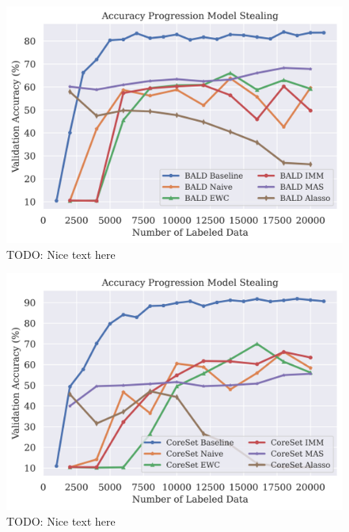 \begin{figure}[h]
    \centering
    \includegraphics[width=0.8\linewidth]{images/results_CALMS/mnist_softmax_bald.png}
    \caption[Accuracy Comparison for Model Stealing on MNIST using the softmax output and the Active Learning strategy BALD]{TODO: Nice text here}
    \label{fig:CALMSMNISTSoftmaxBALD}
\end{figure}

\begin{figure}[h]
    \centering
    \includegraphics[width=0.8\linewidth]{images/results_CALMS/mnist_softmax_coreset.png}
    \caption[Accuracy Comparison for Model Stealing on MNIST using the softmax output and the Active Learning strategy CoreSet]{TODO: Nice text here}
    \label{fig:CALMSMNISTSoftmaxCoreSet}
\end{figure}

